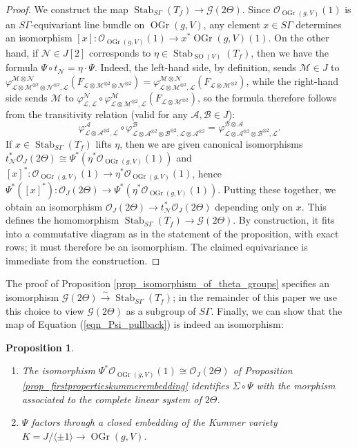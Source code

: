 \documentclass{article} %
\newtheorem{proposition}{Proposition}[section]
\numberwithin{equation}{section}
\DeclareMathOperator{\SO}{SO}
\DeclareMathOperator{\Stab}{Stab}
\newcommand{\sh}[1]{\mathscr{#1}}
\renewcommand{\O}{\mathcal{O}}
\newcommand{\cO}{\mathcal{O}}
\DeclareMathOperator{\OGr}{OGr}
\begin{document}
\begin{proof}
    We construct the map $\Stab_{S\Gamma}(T_f) \to \mathcal{G}(2\Theta)$. Since $\O_{\OGr(g, V)}(1)$ is an $S \Gamma$-equivariant line bundle on $\OGr(g, V)$, any element $x \in S \Gamma$ determines an isomorphism $[x] : \O_{\OGr(g, V)}(1) \to x^\ast \OGr(g, V)(1)$. On the other hand, if $\sh{N} \in J[2]$ corresponds to $\eta \in \Stab_{\SO(V)}(T_f)$, then we have the formula $\Psi \circ t_{\sh{N}} = \eta \cdot \Psi$. Indeed, the left-hand side, by definition, sends $\sh{M} \in J$ to $\varphi^{\sh{M} \otimes \sh{N}}_{\sh{L} \otimes \sh{M}^{\otimes 2} \otimes \sh{N}^{\otimes 2}, \sh{L}}(F_{\sh{L} \otimes \sh{M}^{\otimes 2} \otimes \sh{N}^{\otimes 2}}) = \varphi^{\sh{M} \otimes \sh{N}}_{\sh{L} \otimes \sh{M}^{\otimes 2}, \sh{L}}(F_{\sh{L} \otimes \sh{M}^{\otimes 2}})$, while the right-hand side sends $\sh{M}$ to $\varphi^{\sh{N}}_{\sh{L}, \sh{L}} \circ \varphi^{\sh{M}}_{\sh{L} \otimes \sh{M}^{\otimes 2}, \sh{L}}(F_{\sh{L} \otimes \sh{M}^{\otimes 2}})$, so the formula therefore follows from the transitivity relation (valid for any $\sh{A}, \sh{B} \in J$):
    \[  \varphi^{\sh{A}}_{\sh{L} \otimes \sh{A}^{\otimes 2}, \sh{L}} \circ \varphi^{\sh{B}}_{\sh{L} \otimes \sh{A}^{\otimes 2} \otimes\sh{B}^{\otimes 2}, \sh{L}\otimes \sh{A}^{\otimes 2} } = \varphi^{\sh{B} \otimes \sh{A}}_{\sh{L} \otimes \sh{A}^{\otimes 2} \otimes \sh{B}^{\otimes 2}, \sh{L}}. \]
    If $x \in \Stab_{S \Gamma}(T_f)$ lifts $\eta$, then we are given canonical isomorphisms $t_{\sh{N}}^\ast \cO_J(2 \Theta) \cong \Psi^\ast(\eta^\ast \cO_{\OGr(g, V)}(1))$ and $[x]^\ast : \cO_{\OGr(g, V)}(1) \to \eta^\ast \cO_{\OGr(g, V)}(1)$, hence $\Psi^\ast([x]^\ast) : \O_J(2\Theta) \to \Psi^\ast(\eta^\ast \cO_{\OGr(g, V)}(1))$. Putting these together, we obtain an isomorphism $\cO_J(2 \Theta) \to t_{\sh{N}}^\ast \cO_J(2 \Theta)$ depending only on $x$. This defines the homomorphism $\Stab_{S \Gamma}(T_f) \to \mathcal{G}(2 \Theta)$. By construction, it fits into a commutative diagram as in the statement of the proposition, with exact rows; it must therefore be an isomorphism. The claimed equivariance is immediate from the construction. 
\end{proof}
The proof of Proposition \ref{prop_isomorphism_of_theta_groups} specifies an isomorphism $\mathcal{G}(2\Theta)\xrightarrow{\sim} \Stab_{S\Gamma}(T_f)$; in the remainder of this paper we use this choice to view $\mathcal{G}(2\Theta)$ as a subgroup of $S\Gamma$.
Finally, we can show that the map of Equation (\ref{eqn_Psi_pullback}) is indeed an isomorphism: 
\begin{proposition}
    \begin{enumerate} 
    \item The isomorphism $\Psi^*\O_{\OGr(g, V)}(1)\cong \O_J(2\Theta)$ of Proposition \ref{prop_firstpropertieskummerembedding} identifies $\Sigma \circ \Psi$ with the morphism associated to the complete linear system of $2\Theta$.
    \item $\Psi$ factors through a closed embedding of the Kummer variety $K = J/\langle \pm 1\rangle \to \OGr(g,V)$.
\end{enumerate}
\end{proposition}
\end{document}
